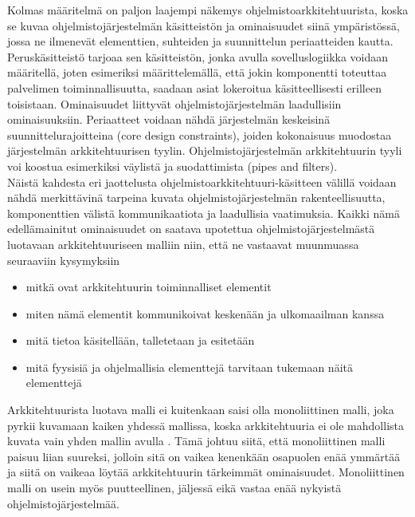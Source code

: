 \documentclass[finnish]{tktltiki2}
\theoremstyle{definition}
\theoremstyle{remark}
\begin{document}
\noindent
Kolmas määritelmä on paljon laajempi näkemys ohjelmistoarkkitehtuurista, koska se kuvaa ohjelmistojärjestelmän käsitteistön ja ominaisuudet siinä ympäristössä, jossa ne ilmenevät elementtien, suhteiden ja suunnittelun periaatteiden kautta. Peruskäsitteistö tarjoaa sen käsitteistön, jonka avulla sovelluslogiikka voidaan määritellä, joten esimeriksi määrittelemällä, että jokin komponentti toteuttaa palvelimen toiminnallisuutta, saadaan asiat lokeroitua käsitteellisesti erilleen toisistaan. Ominaisuudet liittyvät ohjelmistojärjestelmän laadullisiin ominaisuuksiin. Periaatteet voidaan nähdä järjestelmän keskeisinä suunnittelurajoitteina (core design constraints), joiden kokonaisuus muodostaa järjestelmän arkkitehtuurisen tyylin. Ohjelmistojärjestelmän arkkitehtuurin tyyli voi koostua esimerkiksi väylistä ja suodattimista (pipes and filters). %
\\

Näistä kahdesta eri jaottelusta ohjelmistoarkkitehtuuri-käsitteen välillä voidaan nähdä merkittävinä tarpeina kuvata ohjelmistojärjestelmän rakenteellisuutta, komponenttien välistä kommunikaatiota ja laadullisia vaatimuksia. Kaikki nämä edellämainitut ominaisuudet on saatava  upotettua ohjelmistojärjestelmästä luotavaan arkkitehtuuriseen malliin niin, että ne vastaavat muunmuassa seuraaviin kysymyksiin \citep[s. 31 - 33]{Rozanski:2011:SSA:2072649} 

\begin{itemize}
	\item mitkä ovat arkkitehtuurin toiminnalliset elementit
	\item miten nämä elementit kommunikoivat keskenään ja ulkomaailman kanssa
	\item mitä tietoa käsitellään, talletetaan ja esitetään
	\item mitä fyysisiä ja ohjelmallisia elementtejä tarvitaan tukemaan näitä  elementtejä
\end{itemize}

Arkkitehtuurista luotava malli ei kuitenkaan saisi olla monoliittinen malli, joka pyrkii kuvamaan kaiken yhdessä mallissa, koska arkkitehtuuria ei ole mahdollista kuvata vain yhden mallin avulla \citep{Rozanski:2011:SSA:2072649}. Tämä johtuu siitä, että monoliittinen malli paisuu liian suureksi, jolloin sitä on vaikea kenenkään osapuolen enää ymmärtää ja siitä on vaikeaa löytää arkkitehtuurin tärkeimmät ominaisuudet. Monoliittinen malli on usein myös puutteellinen, jäljessä eikä vastaa enää nykyistä ohjelmistojärjestelmää.  
\end{document}
